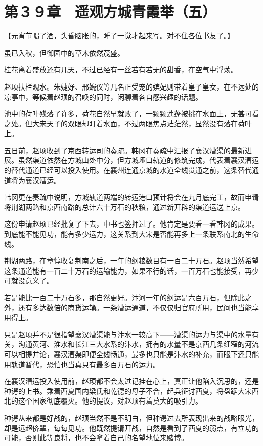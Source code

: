 \section{第３９章　遥观方城青霞举（五）}

【元宵节喝了酒，头昏脑胀的，睡了一觉才起来写。对不住各位书友了。】

虽已入秋，但御园中的草木依然茂盛。

桂花离着盛放还有几天，不过已经有一丝若有若无的甜香，在空气中浮荡。

赵顼扶栏观水。朱婕妤、邢婉仪等几名正受宠的嫔妃则带着皇子皇女，在不远处的凉亭中，等候着赵顼的召唤的同时，闲聊着各自感兴趣的话题。

池中的荷叶残落了许多，荷花自然早就败了，一颗颗莲蓬被挑在水面上，无甚可看之处。但大宋天子的双眼却盯着水面，不过两眼焦点茫茫然，显然没有落在荷叶上。

五日前，赵顼收到了京西转运司的奏疏。韩冈在奏疏中汇报了襄汉漕渠的最新进展。虽然渠道依然在方城山处中分，但方城垭口轨道的修筑完成，代表着襄汉漕运的替代通道已经可以投入使用。在襄州连通京城的水道全线贯通之前，这条替代通道将为襄汉漕运。

韩冈更在奏疏中说明，方城轨道两端的转运港口预计将会在九月底完工，故而申请将荆湖两路和京西南路的总计六十万石的秋粮，通过新开辟的渠道运送上京。

这份申请赵顼已经批复了下去，中书也签押过了。他肯定是要看一看韩冈的成果。到底能不能见功，能有多少运力，这关系到大宋是否能再多上一条联系南北的生命线。

荆湖两路，在章惇收复荆南之后，一年的纲粮数目有一百二十万石。赵顼当然希望这条通道能有一百二十万石的运输能力，如果不行的话，一百万石也能接受，再少可就没意义了。

若是能比一百二十万石多，那自然更好。汴河一年的纲运是六百万石，但除此之外，还有多达数倍的商货运输。一条漕运通道，不仅仅归官府所用，民间也当能享用得上。

只是赵顼并不是很指望襄汉漕渠能与汴水一较高下——漕渠的运力与渠中的水量有关，沟通黄河、淮水和长江三大水系的汴水，拥有的水量不是京西几条细窄的河流可以相提并论，襄汉漕渠即便全线畅通，最多也只能是汴水的补充，而眼下还只能用轨道暂代，恐怕也当真只有最多百万石的运力。

在襄汉漕运投入使用前，赵顼都不会太过记挂在心上，真正让他陷入沉思的，还是种谔的上书。乘着西夏国内梁氏和乾德的母子不合，起兵征讨西夏，将盘踞大宋西北的这个国家彻底覆灭。他的提议，对赵顼有着莫大的吸引力。

种谔从来都是好战的，赵顼当然不是不明白，但种谔过去所表现出来的战略眼光，却是远超侪辈，每每见功。他既然提请开战，自然是看到了西夏的弱点，有立功的可能，否则此等良将，也不会拿着自己的名望地位来赌博。

